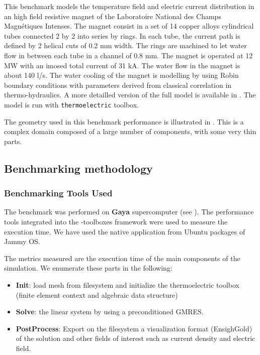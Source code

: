 This benchmark models the temperature field and electric current distribution in an high field resistive magnet of the Laboratoire National des Champs Magnétiques Intenses. The magnet consist in a set of 14 copper alloys cylindrical tubes connected 2 by 2 into series by rings. In each tube, the current path is defined by 2 helical cuts of 0.2 mm width. The rings are machined to let water flow in between each tube
in a channel of 0.8 mm. The magnet is operated at 12 MW with an imosed total current of 31 kA. The water flow in the magnet is about 140 l/s. The water cooling of the magnet is modelling by using Robin boundary conditions with parameters derived from classical correlation in thermo-hydraulics.
A more detailled version of the full model is available in \cite{daver2016,Hild2020}. The
model is run with \texttt{thermoelectric} \Feelpp toolbox.

The geometry used in this benchmark performance is illustrated in
. This is a complex domain
composed of a large number of components, with some very thin parts.




\subsection{Benchmarking methodology}
\subsubsection{Benchmarking Tools Used}
The benchmark was performed on \textbf{Gaya} supercomputer (see ).
The performance tools integrated into the \Feelpp-toolboxes framework were used to measure the execution time.
We have used the \Feelpp native application from Ubuntu packages of Jammy OS.

The metrics measured are the execution time of the main components of the simulation. We enumerate these parts in the following:
\begin{itemize}
\item \textbf{Init}: load mesh from filesystem and initialize the thermoelectric toolbox (finite element context and algebraic data structure)
\item \textbf{Solve}: the linear system by using a preconditioned GMRES.
\item \textbf{PostProcess}: Export on the filesystem a visualization format (EnsighGold) of the
  solution and other fields of interest such as current density and electric field.
\end{itemize}

